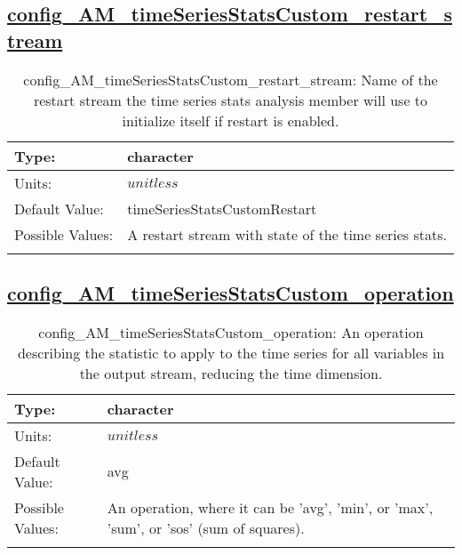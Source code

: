 \subsection[config\_AM\_timeSeriesStatsCustom\_restart\_stream]{\hyperref[sec:nm_tab_AM_timeSeriesStatsCustom]{config\_AM\_timeSeriesStatsCustom\_restart\_stream}}
\label{subsec:nm_sec_config_AM_timeSeriesStatsCustom_restart_stream}
\begin{center}
\begin{longtable}{| p{2.0in} || p{4.0in} |}
    \hline
    Type: & character \\
    \hline
    Units: & $unitless$ \\
    \hline
    Default Value: & timeSeriesStatsCustomRestart \\
    \hline
    Possible Values: & A restart stream with state of the time series stats. \\
    \hline
    \caption{config\_AM\_timeSeriesStatsCustom\_restart\_stream: Name of the restart stream the time series stats analysis member will use to initialize itself if restart is enabled.}
\end{longtable}
\end{center}
\subsection[config\_AM\_timeSeriesStatsCustom\_operation]{\hyperref[sec:nm_tab_AM_timeSeriesStatsCustom]{config\_AM\_timeSeriesStatsCustom\_operation}}
\label{subsec:nm_sec_config_AM_timeSeriesStatsCustom_operation}
\begin{center}
\begin{longtable}{| p{2.0in} || p{4.0in} |}
    \hline
    Type: & character \\
    \hline
    Units: & $unitless$ \\
    \hline
    Default Value: & avg \\
    \hline
    Possible Values: & An operation, where it can be 'avg', 'min', or 'max', 'sum', or 'sos' (sum of squares). \\
    \hline
    \caption{config\_AM\_timeSeriesStatsCustom\_operation: An operation describing the statistic to apply to the time series for all variables in the output stream, reducing the time dimension.}
\end{longtable}
\end{center}

